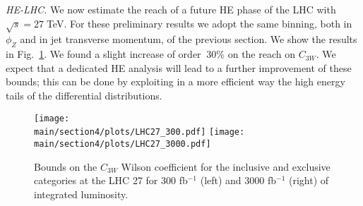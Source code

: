\noindent
\emph{HE-LHC.}
We now estimate the reach of a future HE phase of the LHC with
$\sqrt{s}=27\;$TeV. For these preliminary results we adopt the same binning, both in $\phi_Z$ and in jet transverse momentum, of the previous section. We show the results in Fig.~\ref{fig:LHC27}. We found a slight increase of order $~30\%$ on the reach on $C_{3W}$. We expect that a dedicated HE analysis will lead to a further improvement of these bounds; this can be done by exploiting in a more efficient way the high energy tails of the differential distributions.  


  \begin{figure}[ht]
\begin{center}
 \texttt{[image: \\main/section4/plots/LHC27\_300.pdf]}{}\hspace{2cm}
 \texttt{[image: \\main/section4/plots/LHC27\_3000.pdf]}{}
\end{center}
\caption{Bounds on the $C_{3W}$ Wilson coefficient for the inclusive and exclusive categories at the LHC 27 for 300 fb$^{-1}$ (left) and 3000 fb$^{-1}$ (right) of integrated luminosity.}
\label{fig:LHC27}
\end{figure}


